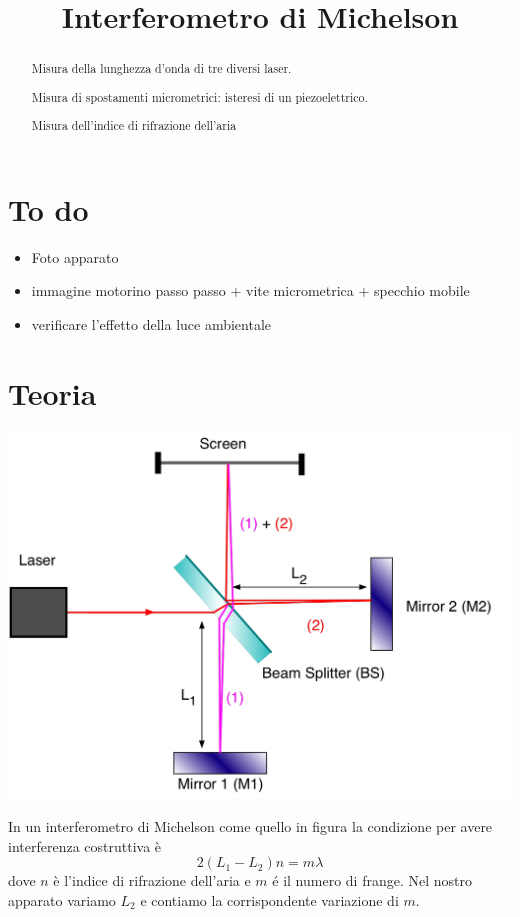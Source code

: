 \documentclass[a4paper]{article}
\begin{document}
	\title{Interferometro di Michelson}
	\maketitle
	
	\section*{To do}
	\begin{itemize}
		\item Foto apparato
		\item immagine motorino passo passo + vite micrometrica + specchio mobile
		\item verificare l'effetto della luce ambientale
	\end{itemize}
	
	
	\begin{abstract}
		 Misura della lunghezza d'onda di tre diversi laser.
		 
		 Misura di spostamenti micrometrici: isteresi di un piezoelettrico.
		 
		 Misura dell'indice di rifrazione dell'aria
	\end{abstract}

\section{Teoria}
\begin{center}
	\begin{minipage}[c]{.50\textwidth}
		\centering
		\includegraphics[width=1\textwidth]{teoria_michelson.png}
	\end{minipage}
	\begin{minipage}[c]{.40\textwidth}
		In un interferometro di Michelson come quello in figura la condizione per avere interferenza costruttiva è \[2(L_1 -L_2)n = m \lambda\] dove $n$ è l'indice di rifrazione dell'aria e $m$ é il numero di frange. Nel nostro apparato variamo $L_2$ e contiamo la corrispondente variazione di $m$.
	\end{minipage}
\end{center}
\end{document}
